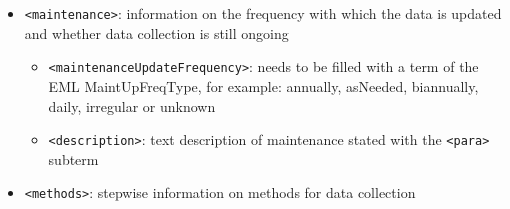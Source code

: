 \documentclass[
]{book}
\providecommand{\tightlist}{%
  \setlength{\itemsep}{0pt}\setlength{\parskip}{0pt}}
\begin{document}
\begin{itemize}
\begin{itemize}
    \begin{itemize}
    \tightlist
    \item
      \texttt{\textless{}generalTaxonomicCoverage\textgreater{}}: text description of the taxa included in the data
    \item
      \texttt{\textless{}taxonomicClassification\textgreater{}}: taxonomic classification of the range of taxa included in the data, specified through a set of subterms:

      \begin{itemize}
      \tightlist
      \item
        \texttt{\textless{}taxonRankName\textgreater{}}: taxonomic level of information
      \item
        \texttt{\textless{}taxonRankValue\textgreater{}}: name of the taxonomic rank being described
      \item
        \texttt{\textless{}commonName\textgreater{}}
      \item
        \texttt{\textless{}taxonID\textgreater{}}: identifier of the taxon from a certain provider that has to be specified with the attribute ``provider'' containing a \protect\hyperlink{URI}{URI} (e.g., provider = ``\url{https://eol.org}'' if the taxon ID is retrieved from EOL)
      \end{itemize}
    \end{itemize}
  \end{itemize}
\item
  {\texttt{\textless{}maintenance\textgreater{}}}: information on the frequency with which the data is updated and whether data collection is still ongoing

  \begin{itemize}
  \tightlist
  \item
    \texttt{\textless{}maintenanceUpdateFrequency\textgreater{}}: needs to be filled with a term of the EML MaintUpFreqType, for example: annually, asNeeded, biannually, daily, irregular or unknown
  \item
    \texttt{\textless{}description\textgreater{}}: text description of maintenance stated with the \texttt{\textless{}para\textgreater{}} subterm
  \end{itemize}
\item
  {\texttt{\textless{}methods\textgreater{}}}: stepwise information on methods for data collection


\end{itemize}
\end{document}
